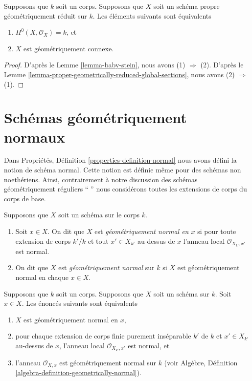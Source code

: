 \begin{lemma}
\label{lemma-geometrically-reduced-stein}
Supposons que $k$ soit un corps. Supposons que $X$ soit un schéma propre
géométriquement réduit sur $k$. Les éléments suivants sont équivalents
\begin{enumerate}
\item $H^0(X, \mathcal{O}_X) = k$, et
\item $X$ est géométriquement connexe.
\end{enumerate}
\end{lemma}

\begin{proof}
D'après le Lemme \ref{lemma-baby-stein}, nous avons (1)
$\Rightarrow$ (2). D'après le Lemme
\ref{lemma-proper-geometrically-reduced-global-sections}, nous avons (2) $\Rightarrow$ (1).
\end{proof}




\section{Schémas géométriquement normaux}
\label{section-geometrically-normal}

\noindent
Dans Propriétés, Définition
\ref{properties-definition-normal} nous avons défini la
notion de schéma normal. Cette notion est définie même pour
des schémas non noethériens. Ainsi, contrairement à notre
discussion des schémas géométriquement réguliers `` '' nous
considérons toutes les extensions de corps du corps de base.

\begin{definition}
\label{definition-geometrically-normal}
Supposons que $X$ soit un schéma sur le corps $k$.
\begin{enumerate}
\item Soit $x \in X$. On dit que $X$ est {\it
géométriquement normal en $x$ } si pour toute extension
de corps $k'/k$ et tout $x' \in X_{k'}$ au-dessus de $x$
l'anneau local $\mathcal{O}_{X_{k'}, x'}$ est normal.
\item On dit que $X$ est {\it géométriquement normal } sur
$k$ si $X$ est géométriquement normal en chaque $x \in X$.
\end{enumerate}
\end{definition}

\begin{lemma}
\label{lemma-geometrically-normal-at-point}
Supposons que $k$ soit un corps.
Supposons que $X$ soit un schéma
sur $k$. Soit $x \in X$. Les
énoncés suivants sont équivalents
\begin{enumerate}
\item $X$ est géométriquement normal en $x$, \item
pour chaque extension de corps finie purement
inséparable $k'$ de $k$ et $x' \in X_{k'}$ au-dessus
de $x$, l'anneau local $\mathcal{O}_{X_{k'}, x'}$
est normal, et \item l'anneau $\mathcal{O}_{X, x}$
est géométriquement normal sur $k$ (voir Algèbre,
Définition \ref{algebra-definition-geometrically-normal}).
\end{enumerate}
\end{lemma}

